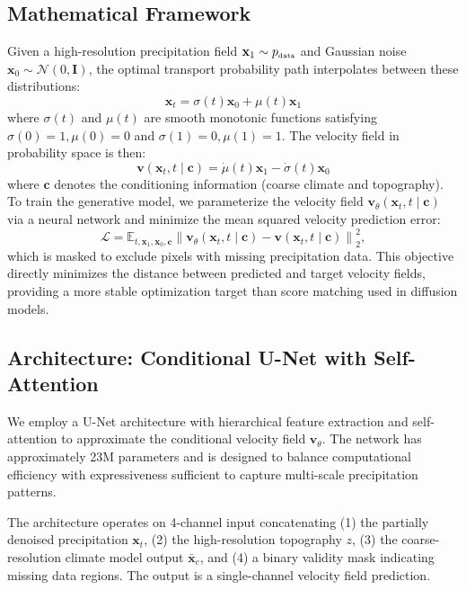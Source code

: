 \documentclass[11pt]{article}
\begin{document}
\subsection{Mathematical Framework}
Given a high-resolution precipitation field $\mathbf{x}_1 \sim p_{\mbox{\tiny data}}$ and Gaussian noise $\mathbf{x}_0 \sim \mathcal{N}(0, \mathbf{I})$, the optimal transport probability path interpolates between these distributions:
$$\mathbf{x}_t = \sigma(t) \mathbf{x}_0 + \mu(t) \mathbf{x}_1$$
where $\sigma(t)$ and $\mu(t)$ are smooth monotonic functions satisfying $\sigma(0)=1, \mu(0)=0$ and $\sigma(1)=0, \mu(1)=1$. The velocity field in probability space is then:
$$\mathbf{v}(\mathbf{x}_t, t \mid \mathbf{c}) = \dot{\mu}(t) \mathbf{x}_1 - \dot{\sigma}(t) \mathbf{x}_0$$
where $\mathbf{c}$ denotes the conditioning information (coarse climate and topography). To train the generative model, we parameterize the velocity field $\mathbf{v}_\theta(\mathbf{x}_t, t \mid \mathbf{c})$ via a neural network and minimize the mean squared velocity prediction error:
\begin{equation}
\label{eq:loss}
\mathcal{L} = \mathbb{E}_{t, \mathbf{x}_1, \mathbf{x}_0, \mathbf{c}} \left\| \mathbf{v}_\theta(\mathbf{x}_t, t \mid \mathbf{c}) - \mathbf{v}(\mathbf{x}_t, t \mid \mathbf{c}) \right\|_2^2,
\end{equation}
which is masked to exclude pixels with missing precipitation data. This objective directly minimizes the distance between predicted and target velocity fields, providing a more stable optimization target than score matching used in diffusion models.

\subsection{Architecture: Conditional U-Net with Self-Attention}
    
We employ a U-Net architecture \citep{ronneberger2015} with hierarchical feature extraction and self-attention \citep{vaswani2017} to approximate the conditional velocity field $\mathbf{v}_\theta$. The network has approximately 23M parameters and is designed to balance computational efficiency with expressiveness sufficient to capture multi-scale precipitation patterns.
    
The architecture operates on 4-channel input concatenating (1) the partially denoised precipitation $\mathbf{x}_t$, (2) the high-resolution topography $z$, (3) the coarse-resolution climate model output $\bar{\mathbf{x}}_c$, and (4) a binary validity mask indicating missing data regions. The output is a single-channel velocity field prediction.
\end{document}

